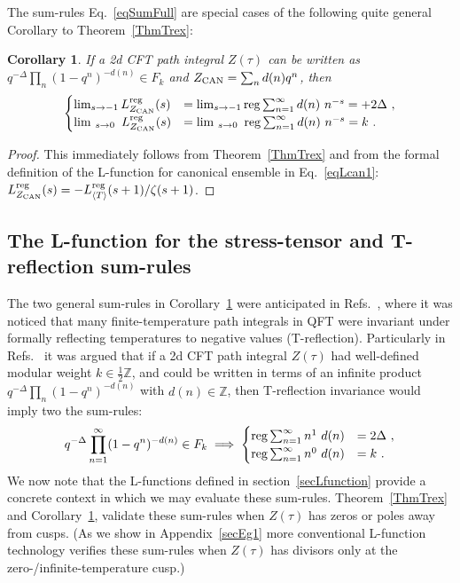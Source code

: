 \documentclass[11pt,a4paper]{article}
\newtheorem{cor}[thm]{Corollary}
\def\Z{\mathbb{Z}}
\newcommand{\reg}{{\rm reg}}
\begin{document}
The sum-rules Eq.~\eqref{eqSumFull} are special cases of the following quite general Corollary to Theorem~\ref{ThmTrex}:

\begin{cor}\label{CorTrex}
If a 2d CFT path integral $Z(\tau)$ can be written as $q^{-\Delta} \prod_n (1-q^n)^{-d(n)} \in F_k$ and $Z_{\rm CAN} = \sum_n d(n) q^n$, then
\begin{align}
\begin{cases}
\lim_{s \to -1} L_{Z_{\rm CAN}}^\reg(s) 
&= \lim_{s \to -1} \reg \sum_{n = 1}^{\infty} d(n)~n^{-s} 
= +2 \Delta~,  \\
\lim_{~s \to 0~} L_{Z_{\rm CAN}}^\reg(s) 
&= \lim_{~s \to 0~} \reg \sum_{n = 1}^{\infty} d(n)~n^{-s} 
= k ~. \label{eqTrex12}
\end{cases}
\end{align}
\end{cor}

\begin{proof}
This immediately follows from Theorem~\ref{ThmTrex} and from the formal definition of the L-function for canonical ensemble in Eq.~\eqref{eqLcan1}: $L_{Z_{\rm CAN}}^\reg(s) = -L_{\langle T \rangle}^\reg(s+1)/\zeta(s+1)$.
\end{proof}

\subsection{The L-function for the stress-tensor and T-reflection sum-rules}\label{secTrex}

The two general sum-rules in Corollary~\ref{CorTrex} were anticipated in Refs.~\cite{14T-rex0, 06T-rex1, 07T-rex2, 30T-rex2-GL2}, where it was noticed that many finite-temperature path integrals in QFT were invariant under formally reflecting temperatures to negative values (T-reflection). Particularly in Refs.~\cite{06T-rex1, 07T-rex2} it was argued that if a 2d CFT path integral $Z(\tau)$ had well-defined modular weight $k \in \tfrac12 \Z$, and could be written in terms of an infinite product $q^{-\Delta} \prod_n (1-q^n)^{-d(n)}$ with $d(n) \in \Z$, then T-reflection invariance would imply two the sum-rules:
\begin{align}
q^{-\Delta} \prod_{n = 1}^{\infty} (1-q^n)^{-d(n)} \in F_k \implies
\begin{cases}
\reg \sum_{n = 1}^{\infty} n^1~d(n) &= 2 \Delta~, \\
\reg \sum_{n = 1}^{\infty} n^0~d(n) &= k ~.
\end{cases}
\end{align}
We now note that the L-functions defined in section~\ref{secLfunction} provide a concrete context in which we may evaluate these sum-rules. Theorem~\ref{ThmTrex} and Corollary~\ref{CorTrex}, validate these sum-rules when $Z(\tau)$ has zeros or poles away from cusps. (As we show in Appendix~\ref{secEg1} more conventional L-function technology verifies these sum-rules when $Z(\tau)$ has divisors only at the zero-/infinite-temperature cusp.)
\end{document}
